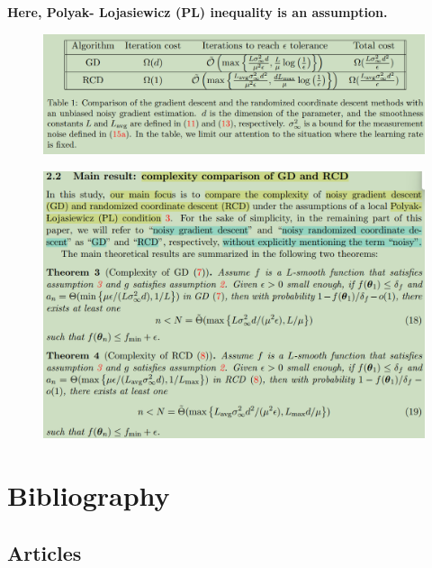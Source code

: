 \documentclass[
        11pt, %
	a4paper, %
]{LegrandOrangeBook}
\begin{document}
\textbf{Here, Polyak- Lojasiewicz (PL) inequality is an assumption.}
\begin{figure}
    \centering
    \includegraphics[width=1\linewidth]{RCD.png}
\end{figure}
\begin{figure}
    \centering
    \includegraphics[width=1\linewidth]{main-results.png}
\end{figure}


\chapter{Bibliography}

\section{Articles}
\end{document}
